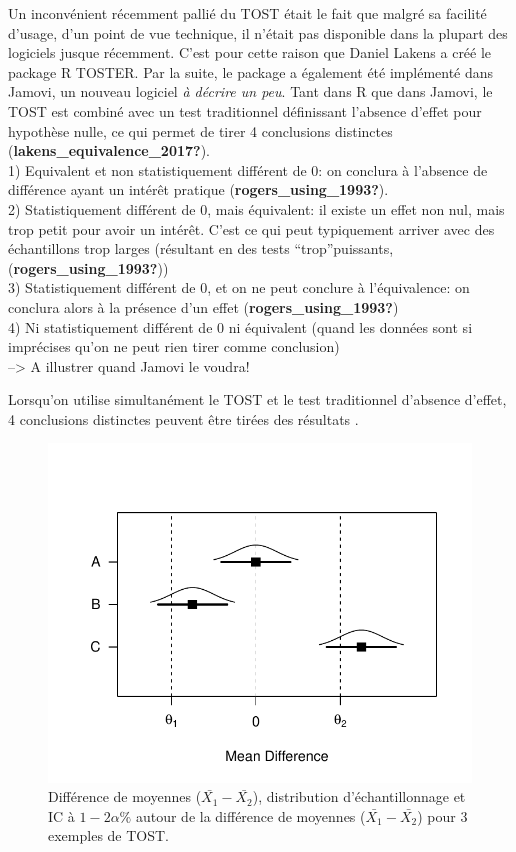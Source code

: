 \documentclass[
  english,
  man]{apa6}
\begin{document}
Un inconvénient récemment pallié du TOST était le fait que malgré sa facilité d'usage, d'un point de vue technique, il n'était pas disponible dans la plupart des logiciels jusque récemment. C'est pour cette raison que Daniel Lakens a créé le package R TOSTER. Par la suite, le package a également été implémenté dans Jamovi, un nouveau logiciel \emph{à décrire un peu}. Tant dans R que dans Jamovi, le TOST est combiné avec un test traditionnel définissant l'absence d'effet pour hypothèse nulle, ce qui permet de tirer 4 conclusions distinctes (\textbf{lakens\_equivalence\_2017?}).\\
1) Equivalent et non statistiquement différent de 0: on conclura à l'absence de différence ayant un intérêt pratique (\textbf{rogers\_using\_1993?}).\\
2) Statistiquement différent de 0, mais équivalent: il existe un effet non nul, mais trop petit pour avoir un intérêt. C'est ce qui peut typiquement arriver avec des échantillons trop larges (résultant en des tests ``trop''puissants, (\textbf{rogers\_using\_1993?}))\\
3) Statistiquement différent de 0, et on ne peut conclure à l'équivalence: on conclura alors à la présence d'un effet (\textbf{rogers\_using\_1993?})\\
4) Ni statistiquement différent de 0 ni équivalent (quand les données sont si imprécises qu'on ne peut rien tirer comme conclusion)\\
--\textgreater{} A illustrer quand Jamovi le voudra!

Lorsqu'on utilise simultanément le TOST et le test traditionnel d'absence d'effet, 4 conclusions distinctes peuvent être tirées des résultats .

\begin{figure}

{\centering \includegraphics{chp5_files/figure-latex/equiv1-1} 

}

\caption{Différence de moyennes ($\bar{X_1}-\bar{X_2}$), distribution d'échantillonnage et IC à $1-2\alpha\%$ autour de la différence de moyennes ($\bar{X_1}-\bar{X_2}$) pour 3 exemples de TOST.}\label{fig:equiv1}
\end{figure}
\end{document}
